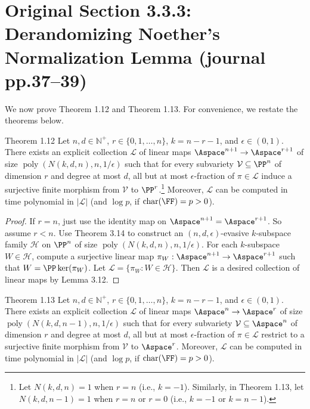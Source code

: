 \section*{Original Section 3.3.3: Derandomizing Noether's Normalization Lemma (journal pp.37--39)}
We now prove Theorem 1.12 and Theorem 1.13. For convenience, we restate the theorems below.
\begin{result}{Theorem 1.12}
Let $n,d\in\mathbb N^+$, $r\in\{0,1,\ldots,n\}$, $k=n-r-1$, and $\epsilon\in(0,1)$. There exists an explicit collection $\mathcal L$ of linear maps $\Aspace^{n+1}\to\Aspace^{r+1}$ of size $\operatorname{poly}(N(k,d,n),n,1/\epsilon)$ such that for every subvariety $\mathcal V\subseteq\PP^n$ of dimension $r$ and degree at most $d$, all but at most $\epsilon$-fraction of $\pi\in\mathcal L$ induce a surjective finite morphism from $\mathcal V$ to $\PP^r$.\footnote{Let $N(k,d,n)=1$ when $r=n$ (i.e., $k=-1$). Similarly, in Theorem 1.13, let $N(k,d,n-1)=1$ when $r=n$ or $r=0$ (i.e., $k=-1$ or $k=n-1$).} Moreover, $\mathcal L$ can be computed in time polynomial in $|\mathcal L|$ (and $\log p$, if $\operatorname{char}(\FF)=p>0$).
\end{result}
\begin{proof}
If $r=n$, just use the identity map on $\Aspace^{n+1}=\Aspace^{r+1}$. So assume $r<n$. Use Theorem 3.14 to construct an $(n,d,\epsilon)$-evasive $k$-subspace family $\mathcal H$ on $\PP^n$ of size $\operatorname{poly}(N(k,d,n),n,1/\epsilon)$. For each $k$-subspace $W\in\mathcal H$, compute a surjective linear map $\pi_W:\Aspace^{n+1}\to\Aspace^{r+1}$ such that $W=\PP\ker(\pi_W)$. Let $\mathcal L=\{\pi_W:W\in\mathcal H\}$. Then $\mathcal L$ is a desired collection of linear maps by Lemma 3.12.
\end{proof}
\begin{result}{Theorem 1.13}
Let $n,d\in\mathbb N^+$, $r\in\{0,1,\ldots,n\}$, $k=n-r-1$, and $\epsilon\in(0,1)$. There exists an explicit collection $\mathcal L$ of linear maps $\Aspace^n\to\Aspace^r$ of size $\operatorname{poly}(N(k,d,n-1),n,1/\epsilon)$ such that for every subvariety $\mathcal V\subseteq\Aspace^n$ of dimension $r$ and degree at most $d$, all but at most $\epsilon$-fraction of $\pi\in\mathcal L$ restrict to a surjective finite morphism from $\mathcal V$ to $\Aspace^r$. Moreover, $\mathcal L$ can be computed in time polynomial in $|\mathcal L|$ (and $\log p$, if $\operatorname{char}(\FF)=p>0$).
\end{result}
